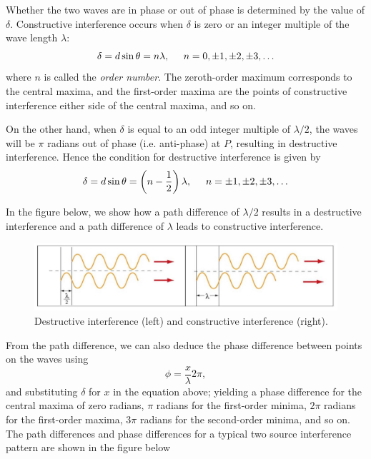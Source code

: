 Whether the two waves are in phase or out of phase is determined by the value of $\delta$. Constructive interference occurs when $\delta$ is zero or an integer multiple of the wave length $\lambda$:
\begin{equation}
    \label{eq:path-difference-constructive}
    \delta = d \sin \theta = n \lambda, \hspace{5mm} n = 0, \pm 1, \pm 2, \pm 3, \ldots
\end{equation}
where $n$ is called the \textit{order number}. The zeroth-order maximum corresponds to the central maxima, and the first-order maxima are the points of constructive interference either side of the central maxima, and so on.

On the other hand, when $\delta$ is equal to an odd integer multiple of $\lambda / 2$, the waves will be $\pi$ radians out of phase (i.e. anti-phase) at $P$, resulting in destructive interference. Hence the condition for destructive interference is given by
\begin{equation}
    \label{eq:path-difference-destructive}
    \delta = d \sin \theta = \left(n - \frac{1}{2}\right) \lambda, \hspace{5mm} n = \pm 1, \pm 2, \pm 3, \ldots
\end{equation}

In the figure below, we show how a path difference of $\lambda / 2$ results in a destructive interference and a path difference of $\lambda$ leads to constructive interference. 
\begin{figure}[h!]
    \centering
    \includegraphics[scale=0.4]{notes/images/Interference-Two-Source-4.JPG}
    \caption{Destructive interference (left) and constructive interference (right).}
\end{figure}
\FloatBarrier
\noindent From the path difference, we can also deduce the phase difference between points on the waves using 
\begin{equation*}
    \phi = \frac{x}{\lambda} 2 \pi,
\end{equation*}
and substituting $\delta$ for $x$ in the equation above; yielding a phase difference for the central maxima of zero radians, $\pi$ radians for the first-order minima, $2\pi$ radians for the first-order maxima, $3\pi$ radians for the second-order minima, and so on.  The path differences and phase differences for a typical two source interference pattern are shown in the figure below

